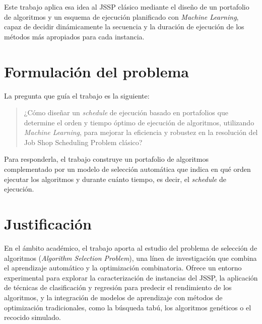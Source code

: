 Este trabajo aplica esa idea al JSSP clásico mediante el diseño de un
portafolio de algoritmos y un esquema de ejecución planificado con
\textit{Machine Learning}, capaz de decidir dinámicamente la secuencia y la
duración de ejecución de los métodos más apropiados para cada instancia.

\section{Formulación del problema}
\label{sec:formulacion}

La pregunta que guía el trabajo es la siguiente:

\begin{quote}
  ¿Cómo diseñar un \textit{schedule} de ejecución basado en portafolios que
  determine el orden y tiempo óptimo de ejecución de algoritmos, utilizando
  \textit{Machine Learning}, para mejorar la eficiencia y robustez en la
  resolución del Job Shop Scheduling Problem clásico?
\end{quote}

Para responderla, el trabajo construye un portafolio de algoritmos
complementado por un modelo de selección automática que indica en qué orden
ejecutar los algoritmos y durante cuánto tiempo, es decir, el \textit{schedule}
de ejecución.

\section{Justificación}
\label{sec:justificacion}

En el ámbito académico, el trabajo aporta al estudio del problema de selección
de algoritmos (\textit{Algorithm Selection Problem}), una línea de
investigación que combina el aprendizaje automático y la optimización
combinatoria. Ofrece un entorno experimental para explorar la caracterización
de instancias del JSSP, la aplicación de técnicas de clasificación y regresión
para predecir el rendimiento de los algoritmos, y la integración de modelos de
aprendizaje con métodos de optimización tradicionales, como la búsqueda tabú,
los algoritmos genéticos o el recocido simulado.

